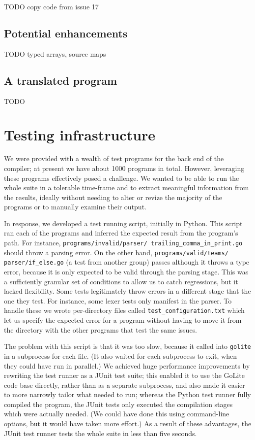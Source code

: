 \documentclass[oneside]{article}
\begin{document}
TODO copy code from issue 17

\subsection{Potential enhancements}
TODO typed arrays, source maps

\subsection{A translated program}
TODO

\section{Testing infrastructure}
We were provided with a wealth of test programs for the back end of the compiler; at present we have about 1000 programs in total. However, leveraging these programs effectively posed a challenge. We wanted to be able to run the whole suite in a tolerable time-frame and to extract meaningful information from the results, ideally without needing to alter or revize the majority of the programs or to manually examine their output.

In response, we developed a test running script, initially in Python. This script ran each of the programs and inferred the expected result from the program's path. For instance, \texttt{programs/invalid/parser/ trailing\_comma\_in\_print.go} should throw a parsing error. On the other hand, \texttt{programs/valid/teams/ parser/if\_else.go} (a test from another group) passes although it throws a type error, because it is only expected to be valid through the parsing stage. This was a sufficiently granular set of conditions to allow us to catch regressions, but it lacked flexibility. Some tests legitimately throw errors in a different stage that the one they test. For instance, some lexer tests only manifest in the parser. To handle these we wrote per-directory files called \texttt{test\_configuration.txt} which let us specify the expected error for a program without having to move it from the directory with the other programs that test the same issues.

The problem with this script is that it was too slow, because it called into \texttt{golite} in a subprocess for each file. (It also waited for each subprocess to exit, when they could have run in parallel.) We achieved huge performance improvements by rewriting the test runner as a JUnit test suite; this enabled it to use the GoLite code base directly, rather than as a separate subprocess, and also made it easier to more narrowly tailor what needed to run; whereas the Python test runner fully compiled the program, the JUnit tests only executed the compilation stages which were actually needed. (We could have done this using command-line options, but it would have taken more effort.) As a result of these advantages, the JUnit test runner tests the whole suite in less than five seconds.
\end{document}
